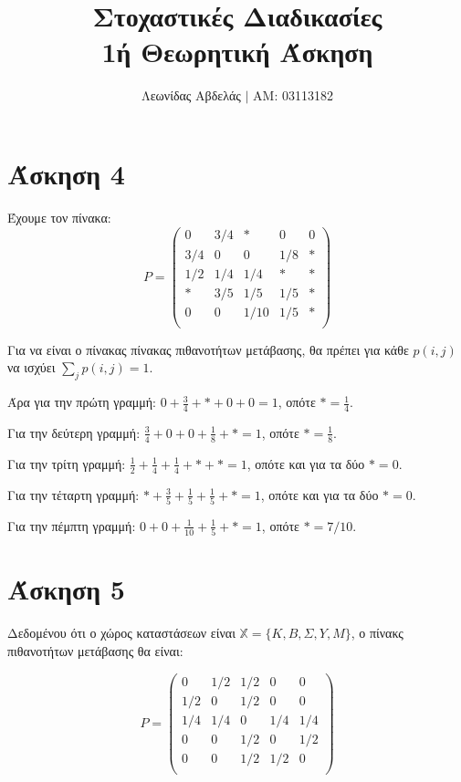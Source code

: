 \documentclass{article}
\title{Στοχαστικές Διαδικασίες \\
    1ή Θεωρητική Άσκηση}
\begin{document}
\date{}
\author{Λεωνίδας Αβδελάς $|$ ΑΜ: 03113182}

\maketitle

\section*{Άσκηση 4}

Έχουμε τον πίνακα:
\begin{equation*}
    P = 
    \begin{pmatrix}
    0 & 3/4 & * & 0 & 0\\
    3/4 & 0 & 0 & 1/8 & *\\
    1/2 & 1/4 & 1/4 & * & *\\
    * & 3/5 & 1/5 & 1/5 & *\\
    0 & 0 & 1/10 & 1/5 & *\\
    \end{pmatrix}
\end{equation*}

Για να είναι ο πίνακας πίνακας πιθανοτήτων μετάβασης, θα πρέπει για κάθε $p(i,j)$ να ισχύει $\sum_{j}{p(i,j)} = 1$.

Άρα για την πρώτη γραμμή: $0 + \frac{3}{4} + * + 0 + 0 = 1$, οπότε $* = \frac{1}{4}$.

Για την δεύτερη γραμμή: $\frac{3}{4} + 0 + 0 + \frac{1}{8} + * = 1$, οπότε $* = \frac{1}{8}$.

Για την τρίτη γραμμή: $\frac{1}{2} + \frac{1}{4} + \frac{1}{4} + * + * = 1$, οπότε και για τα δύο $* = 0$.

Για την τέταρτη γραμμή: $* + \frac{3}{5} + \frac{1}{5} + \frac{1}{5} + * = 1$, οπότε και για τα δύο $* = 0$.

Για την πέμπτη γραμμή: $0 + 0 + \frac{1}{10} + \frac{1}{5} + * = 1$, οπότε $* = 7/10$.

\section*{Άσκηση 5}

Δεδομένου ότι ο χώρος καταστάσεων είναι $\mathbb{X} = \{K, B, Σ, Y, M\}$, ο πίνακς πιθανοτήτων μετάβασης θα είναι:

\begin{equation*}
    P = 
    \begin{pmatrix}
        0 & 1/2 & 1/2 & 0 & 0\\
        1/2 & 0 & 1/2 & 0 & 0\\
        1/4 & 1/4 & 0 & 1/4 & 1/4\\
        0 & 0 & 1/2 & 0 & 1/2\\
        0 & 0 & 1/2 & 1/2 & 0\\
    \end{pmatrix}
\end{equation*}
\end{document}
